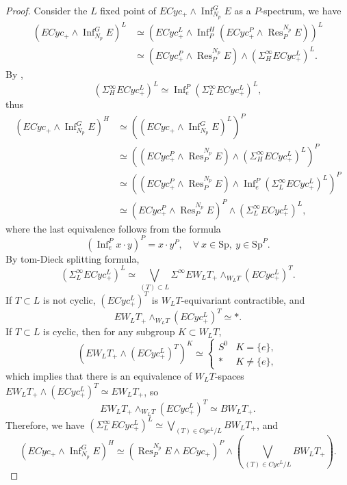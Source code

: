 \documentclass{amsart}
\theoremstyle{plain}
\theoremstyle{definition}
\theoremstyle{remark}
\begin{document}
\begin{proof}
    Consider the $L$ fixed point of $ECyc_+\wedge \operatorname{Inf}_{N_p}^G E$ as a $P$-spectrum, we have
    \[
    \begin{aligned}
        (ECyc_+\wedge \operatorname{Inf}_{N_p}^G E)^L & \simeq (ECyc^L_+\wedge \operatorname{Inf}_{P}^{H} (ECyc^P_+\wedge \operatorname{Res}_{P}^{N_p}E))^L \\
        & \simeq (ECyc^P_+\wedge \operatorname{Res}_{P}^{N_p}E) \wedge (\Sigma_H^\infty ECyc_+^L)^L.
    \end{aligned}
    \] 
    By , 
    \[
    (\Sigma_H^\infty ECyc_+^L)^L\simeq \operatorname{Inf}_e^{P}(\Sigma_L^\infty ECyc_+^L)^L,
    \] 
    thus
    \[
    \begin{aligned}
        (ECyc_+\wedge \operatorname{Inf}_{N_p}^G E)^H&\simeq ((ECyc_+\wedge \operatorname{Inf}_{N_p}^G E)^L)^P \\
        &\simeq ((ECyc^P_+\wedge \operatorname{Res}_{P}^{N_p}E) \wedge (\Sigma_H^\infty ECyc_+^L)^L)^P\\
        &\simeq ((ECyc^P_+\wedge \operatorname{Res}_{P}^{N_p}E) \wedge \operatorname{Inf}_e^{P}(\Sigma_L^\infty ECyc_+^L)^L)^P\\
        &\simeq (ECyc^P_+\wedge \operatorname{Res}_{P}^{N_p}E)^P \wedge (\Sigma_L^\infty ECyc_+^L)^L,
    \end{aligned}
    \]
    where the last equivalence follows from the formula 
    \[
    (\operatorname{Inf}_e^P x\cdot y)^P=x\cdot y^P, \quad \forall \ x\in \mathrm{Sp}, \ y\in \mathrm{Sp}^P.
    \]
    By tom-Dieck splitting formula, 
    \[
    (\Sigma_L^\infty ECyc_+^L)^L\simeq \bigvee_{(T)\subset L}\Sigma^\infty EW_L T_+\wedge_{W_L T} (ECyc^L_+)^T.
    \] 
    If $T\subset L$ is not cyclic, $(ECyc^L_+)^T$ is $W_L T$-equivariant contractible, and 
    \[ EW_L T_+\wedge_{W_L T} (ECyc^L_+)^T\simeq \ast.\] 
    If $T\subset L$ is cyclic, then for any subgroup $K \subset W_L T$,
    \[
    (EW_L T_+\wedge (ECyc_+^L)^T)^{K}\simeq\begin{cases}
        S^0 & K=\{e\},\\
        \ast & K\neq \{e\},
    \end{cases}
    \]
    which implies that there is an equivalence of $W_L T$-spaces $EW_L T_+\wedge (ECyc_+^L)^T\simeq EW_L T_+$, so 
    \[
    EW_L T_+\wedge_{W_L T} (ECyc^L_+)^T\simeq BW_L T_+.
    \] 
    Therefore, we have $(\Sigma_L^\infty ECyc_+^L)^L\simeq \bigvee_{(T)\in Cyc^L/L}BW_L T_+$, and 
    \[  
    (ECyc_+\wedge \operatorname{Inf}_{N_p}^G E)^H \simeq (\operatorname{Res}_P^{N_p} E\wedge ECyc_+)^P \wedge (\bigvee_{(T)\in Cyc^L/L}BW_L T_+).
    \]
\end{proof}
\end{document}
